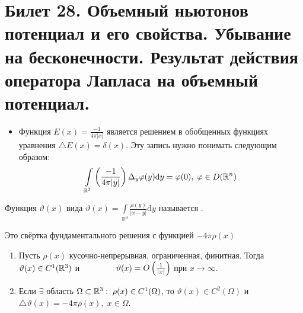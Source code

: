 \section{Билет 28. Объемный ньютонов потенциал и его свойства. Убывание на бесконечности. Результат
действия оператора Лапласа на объемный потенциал.}

\begin{itemize}
	\item Функция $E(x) = \frac{-1}{4\pi|x|}$ является решением в обобщенных функциях уравнения $\triangle E(x) = \delta (x)$. Эту запись нужно понимать следующим образом:
    $$
    \int\limits_{\mathbb{R}^3}\left(\frac{-1}{4\pi|y|}\right)\Delta_y \varphi (y) \mathrm{d}y = \varphi(0),\; \varphi \in D(\mathbb{R}^n)
    $$
\end{itemize}

\begin{definition}
	Функция $\vartheta (x)$ вида $\vartheta (x) = \int\limits_{\mathbb{R}^3}\frac{\rho (y)}{|x-y|}\mathrm{d}y$ называется \underline{\it {}}.
\end{definition}

\begin{remark} 
Это свёртка фундаментального решения с функцией $-4\pi\rho (x)$
\end{remark}

\begin{theorem}

	\begin{enumerate}
		\item Пусть $\rho (x)$ \text{---} кусочно-непрерывная, ограниченная, финитная. Тогда $\vartheta (x) \in C^1(\mathbb{R}^3)$ и $\qquad \qquad \vartheta (x) = O\left(\frac{1}{|x|}\right)$ при $x\rightarrow \infty $.
        \item Если $\exists$ область $\Omega \subset \mathbb{R}^3: \;\rho (x) \in C^1(\Omega)$, то $\vartheta (x) \in C^2 (\Omega)$ и $\triangle \vartheta (x) = -4\pi \rho (x), \;x \in \Omega$.
	\end{enumerate}
\end{theorem}

